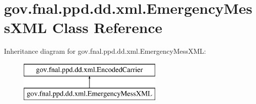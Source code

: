 \hypertarget{classgov_1_1fnal_1_1ppd_1_1dd_1_1xml_1_1EmergencyMessXML}{\section{gov.\-fnal.\-ppd.\-dd.\-xml.\-Emergency\-Mess\-X\-M\-L Class Reference}
\label{classgov_1_1fnal_1_1ppd_1_1dd_1_1xml_1_1EmergencyMessXML}
}
Inheritance diagram for gov.\-fnal.\-ppd.\-dd.\-xml.\-Emergency\-Mess\-X\-M\-L\-:\begin{figure}[H]
\begin{center}
\leavevmode
\includegraphics[height=2.000000cm]{classgov_1_1fnal_1_1ppd_1_1dd_1_1xml_1_1EmergencyMessXML}
\end{center}
\end{figure}
